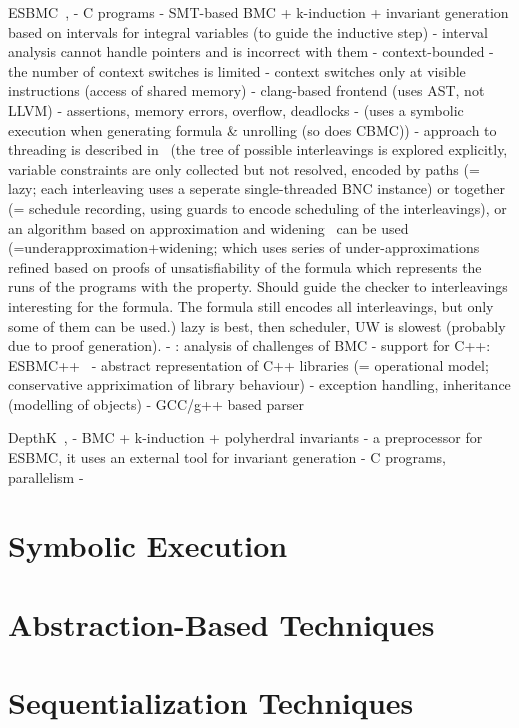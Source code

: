 ESBMC~\cite{Gadelha2019}, \cite{Gadelha2018}
- C programs
- SMT-based BMC + k-induction + invariant generation based on intervals for integral variables (to guide the inductive step)
- interval analysis cannot handle pointers and is incorrect with them
- context-bounded - the number of context switches is limited
- context switches only at visible instructions (access of shared memory)
- clang-based frontend (uses AST, not LLVM)
- assertions, memory errors, overflow, deadlocks
- (uses a symbolic execution when generating formula \& unrolling (so does CBMC))
- approach to threading is described in~\cite{Cordeiro2011} (the tree of possible interleavings is explored explicitly, variable constraints are only collected but not resolved, encoded by paths (= lazy; each interleaving uses a seperate single-threaded BNC instance) or together (= schedule recording, using guards to encode scheduling of the interleavings), or an algorithm based on approximation and widening~\cite{Grumberg2005} can be used (=underapproximation+widening; which uses series of under-approximations refined based on proofs of unsatisfiability of the formula which represents the runs of the programs with the property. Should guide the checker to interleavings interesting for the formula. The formula still encodes all interleavings, but only some of them can be used.) lazy is best, then scheduler, UW is slowest (probably due to proof generation).
- \cite{Cordeiro2016}: analysis of challenges of BMC
- support for C++: ESBMC++~\cite{Ramalho2013}
  - abstract representation of C++ libraries (= operational model; conservative appriximation of library behaviour)
  - exception handling, inheritance (modelling of objects)
  - GCC/g++ based parser


DepthK~\cite{Rocha2017}, \cite{Rocha2017svc}
- BMC + k-induction + polyherdral invariants
- a preprocessor for ESBMC, it uses an external tool for invariant generation
- C programs, parallelism
- 

\section{Symbolic Execution}

\section{Abstraction-Based Techniques}

\section{Sequentialization Techniques}

